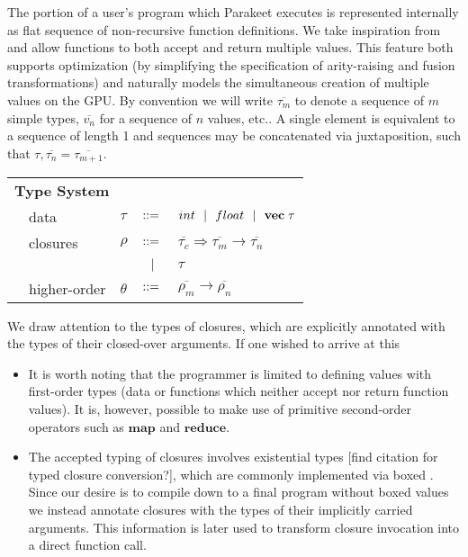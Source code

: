 \documentclass[preprint]{sigplanconf}
\begin{document}
The portion of a user's program which Parakeet executes is represented internally as flat sequence of non-recursive function definitions. 
We take inspiration from \cite{Bol09} and allow functions to both accept and return multiple values. This feature both supports optimization (by simplifying the specification of arity-raising and fusion transformations) and naturally models the simultaneous creation of multiple values on the GPU. By convention we will write $\overline{\tau_m}$ to denote a sequence of $m$ simple types, $\overline{v_n}$ for a sequence  of $n$ values, etc.. A single element is equivalent to a sequence of length 1 and sequences may be concatenated via juxtaposition, such that $\tau, \overline{\tau_n} = \overline{\tau_{m+1}}$. 
\\[5pt]
\begin{tabular}{m{0.005cm}m{1.8cm}m{0.05cm}m{0.2cm}p{4.8cm}}
\multicolumn{5}{l}{\textbf{Type System}} \\[4pt]
& data     & $\tau$    & $::=$ & $int \ \ | \ \  float \ \ | \ \  \mathbf{vec} \; \tau   $ \\[4pt]
& closures        & $\rho$  & $::=$ & $\overline{\tau_{c}} \Rightarrow \overline{\tau_m} \rightarrow \overline{\tau_n}$\\[2pt]
&                 &           & $\ \ | \ \ $    & $\tau$ \\[4pt]
& higher-order    & $\theta$  & $::=$ & $\overline{\rho_m} \rightarrow \overline{\rho_n} $ \\[4pt]
\end{tabular}
We draw attention to the types of closures, which are explicitly annotated with the types of their closed-over arguments. If one wished to arrive at this 
\begin{itemize}
\item It is worth noting that the programmer is limited to defining values with first-order types (data or functions which neither accept nor return function values). It is, however, possible to make use of primitive second-order operators such as $\mathbf{map}$ and $\mathbf{reduce}$. 
\item The accepted typing of closures involves existential types [find citation for typed closure conversion?], which are commonly implemented via boxed . Since our desire is to compile down to a final program without boxed values we instead annotate closures with the types of their implicitly carried arguments. This information is later used to transform closure invocation into a direct function call. 
\end{itemize}
\end{document}
